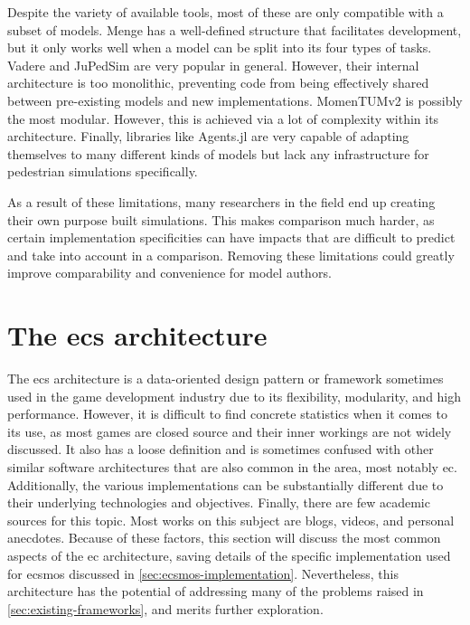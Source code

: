 \documentclass[twoside, 11pt]{article}
\begin{document}
Despite the variety of available tools, most of these are only compatible with a subset of models. Menge has a well-defined structure that facilitates development, but it only works well when a model can be split into its four types of tasks. Vadere and JuPedSim are very popular in general. However, their internal architecture is too monolithic, preventing code from being effectively shared between pre-existing models and new implementations. MomenTUMv2 is possibly the most modular. However, this is achieved via a lot of complexity within its architecture. Finally, libraries like Agents.jl are very capable of adapting themselves to many different kinds of models but lack any infrastructure for pedestrian  simulations specifically.

As a result of these limitations, many researchers in the field end up creating their own purpose built simulations. This makes comparison much harder, as certain implementation specificities can have impacts that are difficult to predict and take into account in a comparison. Removing these limitations could greatly improve comparability and convenience for model authors.

\section{The \acrlong{ecs} architecture} \label{sec:ecs-architecture}

The \gls{ecs} architecture is a data-oriented design pattern or framework sometimes used in the game development industry due to its flexibility, modularity, and high performance. However, it is difficult to find concrete statistics when it comes to its use, as most games are closed source and their inner workings are not widely discussed. It also has a loose definition and is sometimes confused with other similar software architectures that are also common in the area, most notably \gls{ec}. Additionally, the various implementations can be substantially different due to their underlying technologies and objectives. Finally, there are few academic sources for this topic. Most works on this subject are blogs, videos, and personal anecdotes. Because of these factors, this section will discuss the most common aspects of the \gls{ec} architecture, saving details of the specific implementation used for \gls{ecsmos} discussed in \autoref{sec:ecsmos-implementation}. Nevertheless, this architecture has the potential of addressing many of the problems raised in \autoref{sec:existing-frameworks}, and merits further exploration.
\end{document}
